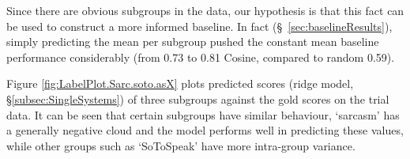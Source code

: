 \documentclass[11pt,letterpaper]{article}
\begin{document}

Since there are obvious subgroups in the data, our hypothesis is that this fact can be used to construct a more informed baseline. In fact (\S~\ref{sec:baselineResults}), simply predicting the mean per subgroup pushed the constant mean baseline performance considerably (from 0.73 to 0.81 Cosine, compared to random 0.59). 

Figure \ref{fig:LabelPlot.Sarc.soto.asX} plots predicted scores (ridge model, \S\ref{subsec:SingleSystems}) of three subgroups against the gold scores on the trial data. It can be seen that certain subgroups have similar behaviour, `sarcasm' has a generally negative cloud and the model performs well in predicting these values, while other groups such as `SoToSpeak' have more intra-group variance. %




\begin{table}[ht!]
\caption{Tweet Label Type and Expression.}
\label{tbl:tweettype}
\end{table}

\end{document}
